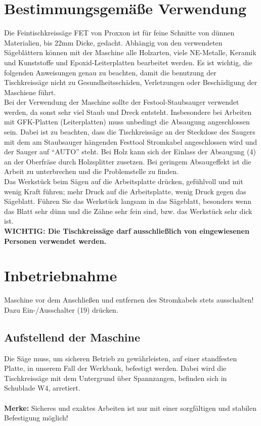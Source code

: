 \documentclass{\basedir/fablab-document}
\begin{document}
\section{Bestimmungsgemäße Verwendung}
Die Feintischkreissäge FET von Proxxon ist für feine Schnitte von dünnen Materialien, bis 22mm Dicke, gedacht. Abhängig von den verwendeten Sägeblättern können mit der Maschine alle Holzarten, viele NE-Metalle, Keramik und Kunststoffe und Epoxid-Leiterplatten bearbeitet werden. Es ist wichtig, die folgenden Anweisungen genau zu beachten, damit die benutzung der Tischkreissäge nicht zu Gesundheitsschäden, Verletzungen oder Beschädigung der Maschiene führt.\\
Bei der Verwendung der Maschine sollte  der Festool-Staubsauger verwendet werden, da sonst sehr viel Staub und Dreck entsteht. Insbesondere bei Arbeiten mit GFK-Platten (Leiterplatten) muss unbedingt die Absaugung angeschlossen sein. Dabei ist zu beachten, dass die Tischkreissäge an der Steckdose des Saugers mit dem am Staubsauger hängenden Festtool Stromkabel angeschlossen wird und der Sauger auf \enquote{AUTO} steht. Bei Holz kann sich der Einlass der Absaugung (4) an der Oberfräse durch Holzsplitter zusetzen. Bei geringem Absaugeffekt ist die Arbeit zu unterbrechen und die Problemstelle zu finden.\\
Das Werkstück beim Sägen auf die Arbeitsplatte drücken, gefühlvoll und mit wenig Kraft führen; mehr Druck auf die Arbeitsplatte, wenig Druck gegen das Sägeblatt. Führen Sie das Werkstück langsam in das Sägeblatt, besonders wenn das Blatt sehr dünn und die Zähne sehr fein sind, bzw. das Werkstück sehr dick ist. \\
\textbf{WICHTIG: Die Tischkreissäge darf ausschließlich von eingewiesenen Personen verwendet werden.}


\section{Inbetriebnahme}
Maschine vor dem Anschließen und entfernen des Stromkabels stets ausschalten! Dazu Ein-/Ausschalter (19) drücken.

\subsection{Aufstellend der Maschine}
Die Säge muss, um sicheren Betrieb zu gewährleisten, auf einer standfesten Platte, in unserem Fall der Werkbank, befestigt werden. Dabei wird die Tischkreissäge mit dem Untergrund über Spannzangen, befinden sich in Schublade W4, arretiert. \\ \\
\textbf{Merke:}
Sicheres und exaktes Arbeiten ist nur mit einer sorgfältigen und stabilen Befestigung möglich!
\end{document}
